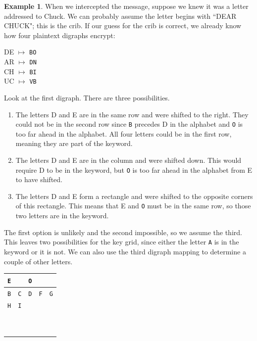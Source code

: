 \documentclass{book}
\theoremstyle{plain}
\theoremstyle{definition}
\newtheorem{example}[theorem]{Example}
\newcommand{\ciphertext}[1]{\texttt{#1}} %
\begin{document}
\begin{example}
When we intercepted the message, suppose we knew it was a letter addressed to Chuck. We can probably assume the letter begins with ``DEAR CHUCK"; this is the crib. If our guess for the crib is correct, we already know how four plaintext digraphs encrypt:
\begin{center}
DE $\mapsto$ \ciphertext{BO} \\
AR $\mapsto$ \ciphertext{DN} \\
CH $\mapsto$ \ciphertext{BI} \\
UC $\mapsto$ \ciphertext{VB}
\end{center}
Look at the first digraph. There are three possibilities.
\begin{enumerate}
\item The letters D and E are in the same row and were shifted to the right. They could not be in the second row since \ciphertext{B} precedes D in the alphabet and \ciphertext{O} is too far ahead in the alphabet. All four letters could be in the first row, meaning they are part of the keyword.
\item The letters D and E are in the column and were shifted down. This would require D to be in the keyword, but \ciphertext{O} is too far ahead in the alphabet from E to have shifted.
\item The letters D and E form a rectangle and were shifted to the opposite corners of this rectangle. This means that E and \ciphertext{O} must be in the same row, so those two letters are in the keyword.
\end{enumerate}
The first option is unlikely and the second impossible, so we assume the third. This leaves two possibilities for the key grid, since either the letter \ciphertext{A} is in the keyword or it is not. We can also use the third digraph mapping to determine a couple of other letters.
\begin{center}
\begin{tabular}{|c|c|c|c|c|}
\hline
\ciphertext{E} & \ciphertext{ } & \ciphertext{O} & \ciphertext{ } & \ciphertext{ } \\
\hline
\ciphertext{B} & \ciphertext{C} & \ciphertext{D} & \ciphertext{F} & \ciphertext{G} \\
\hline
\ciphertext{H} & \ciphertext{I} & \ciphertext{ } & \ciphertext{ } & \ciphertext{ } \\
\hline
\ciphertext{ } & \ciphertext{ } & \ciphertext{ } & \ciphertext{ } & \ciphertext{ } \\
\hline
\ciphertext{ } & \ciphertext{ } & \ciphertext{ } & \ciphertext{ } & \ciphertext{ } \\

\end{tabular}
\end{center}
\end{example}
\end{document}
